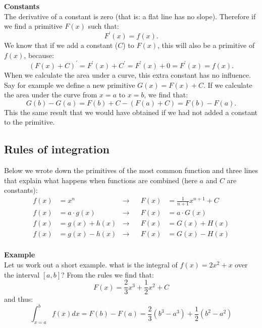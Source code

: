 \documentclass[a4paper]{report}
\begin{document}
\begin{mdframed}
\textbf{Constants}\\
The derivative of a constant is zero (that is: a flat line has no slope). Therefore if we find a primitive $F(x)$ such that:
\begin{equation*}
F^\prime(x) = f(x). 
\end{equation*}
We know that if we add a constant ($C$) to $F(x)$, this will also be a primitive of $f(x)$, because:
\begin{equation*}
(F(x)+C)^\prime = F^\prime(x) + C^\prime = F^\prime(x) + 0 = F^\prime(x) = f(x).
\end{equation*}
When we calculate the area under a curve, this extra constant has no influence. Say for example we define a new primitive $G(x) = F(x) + C$. If we calculate the area under the curve from $x=a$ to $x=b$, we find that:
\begin{equation*}
G(b) - G(a) = F(b) + C - (F(a) + C) = F(b) - F(a).
\end{equation*}
This the same result that we would have obtained if we had not added a constant to the primitive.
\end{mdframed}

\subsection{Rules of integration}
Below we wrote down the primitives of the most common function and three lines that explain what happens when functions are combined (here $a$ and $C$ are constants):
\begin{align*}
f(x) &= x^n  &\rightarrow & &F(x) &= \frac{1}{n+1}x^{n+1}+C \\
f(x) &= a\cdot g(x) &\rightarrow & &F(x) &= a\cdot G(x) \\
f(x) &= g(x) + h(x) &\rightarrow & &F(x) &= G(x) + H(x)\\
f(x) &= g(x) - h(x) &\rightarrow & &F(x) &= G(x) - H(x)\\
\end{align*}

\begin{mdframed}[backgroundcolor=exampcol]
\textbf{Example}\\
Let us work out a short example. what is the integral of $f(x)=2 x^2 + x$ over the interval $\left[a,b\right]$? From the rules we find that:
\begin{equation*}
F(x) = \frac{2}{3} x^3 + \frac{1}{2} x^2+ C
\end{equation*}
and thus:
\begin{equation*}
\int_{x=a}^b f(x) dx = F(b)-F(a) = \frac{2}{3} \left(b^3 - a^3\right) + \frac{1}{2}\left(b^2-a^2\right)
\end{equation*}
\end{mdframed}
\end{document}

